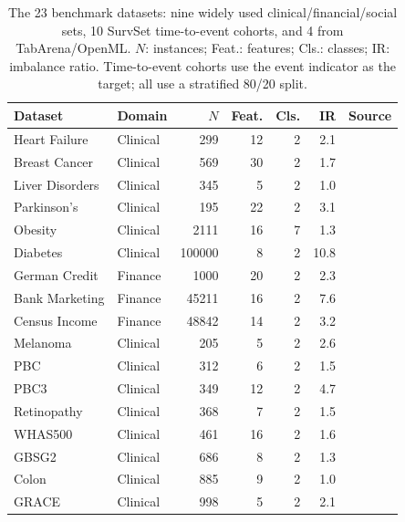 \begin{table}[t]\centering\scriptsize
\setlength{\tabcolsep}{4pt}\renewcommand{\arraystretch}{1.05}
\caption{The 23 benchmark datasets: nine widely used clinical/financial/social sets, 10 SurvSet time-to-event cohorts, and 4 from TabArena/OpenML. $N$: instances; Feat.: features; Cls.: classes; IR: imbalance ratio. Time-to-event cohorts use the event indicator as the target; all use a stratified 80/20 split.}
\label{tab:datasets}
\begin{tabular}{@{}llrrrrl@{}}\toprule
\textbf{Dataset} & \textbf{Domain} & \textbf{$N$} & \textbf{Feat.} & \textbf{Cls.} & \textbf{IR} & \textbf{Source} \\ \midrule
Heart Failure & Clinical & 299 & 12 & 2 & 2.1 & \cite{chicco2020ml} \\
Breast Cancer & Clinical & 569 & 30 & 2 & 1.7 & \cite{wdbc_17} \\
Liver Disorders & Clinical & 345 & 5 & 2 & 1.0 & \cite{liver_disorders_60} \\
Parkinson's & Clinical & 195 & 22 & 2 & 3.1 & \cite{little2007exploiting} \\
Obesity & Clinical & 2111 & 16 & 7 & 1.3 & \cite{palechor2019dataset} \\
Diabetes & Clinical & 100000 & 8 & 2 & 10.8 & \cite{kaggle_diabetes} \\
German Credit & Finance & 1000 & 20 & 2 & 2.3 & \cite{german_credit} \\
Bank Marketing & Finance & 45211 & 16 & 2 & 7.6 & \cite{moro2014data} \\
Census Income & Finance & 48842 & 14 & 2 & 3.2 & \cite{kohavi1996scaling} \\
Melanoma & Clinical & 205 & 5 & 2 & 2.6 & \cite{drysdale2022survset} \\
PBC & Clinical & 312 & 6 & 2 & 1.5 & \cite{drysdale2022survset} \\
PBC3 & Clinical & 349 & 12 & 2 & 4.7 & \cite{drysdale2022survset} \\
Retinopathy & Clinical & 368 & 7 & 2 & 1.5 & \cite{drysdale2022survset} \\
WHAS500 & Clinical & 461 & 16 & 2 & 1.6 & \cite{drysdale2022survset} \\
GBSG2 & Clinical & 686 & 8 & 2 & 1.3 & \cite{drysdale2022survset} \\
Colon & Clinical & 885 & 9 & 2 & 1.0 & \cite{drysdale2022survset} \\
GRACE & Clinical & 998 & 5 & 2 & 2.1 & \cite{drysdale2022survset} \\

\end{tabular}
\end{table}
